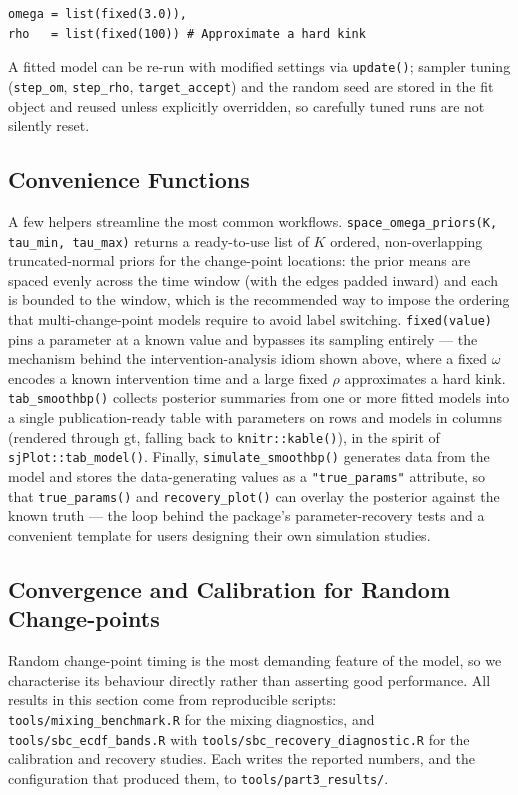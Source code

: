 \documentclass[12pt]{article}
\newcommand{\pkg}[1]{\textsf{#1}}
\newcommand{\code}[1]{\texttt{#1}}
\begin{document}
\begin{verbatim}
omega = list(fixed(3.0)),
rho   = list(fixed(100)) # Approximate a hard kink
\end{verbatim}

A fitted model can be re-run with modified settings via \code{update()}; sampler tuning (\code{step\_om}, \code{step\_rho}, \code{target\_accept}) and the random seed are stored in the fit object and reused unless explicitly overridden, so carefully tuned runs are not silently reset.

\subsection{Convenience Functions}

A few helpers streamline the most common workflows. \code{space\_omega\_priors(K, tau\_min, tau\_max)} returns a ready-to-use list of $K$ ordered, non-overlapping truncated-normal priors for the change-point locations: the prior means are spaced evenly across the time window (with the edges padded inward) and each is bounded to the window, which is the recommended way to impose the ordering that multi-change-point models require to avoid label switching. \code{fixed(value)} pins a parameter at a known value and bypasses its sampling entirely --- the mechanism behind the intervention-analysis idiom shown above, where a fixed $\omega$ encodes a known intervention time and a large fixed $\rho$ approximates a hard kink. \code{tab\_smoothbp()} collects posterior summaries from one or more fitted models into a single publication-ready table with parameters on rows and models in columns (rendered through \pkg{gt}, falling back to \code{knitr::kable()}), in the spirit of \code{sjPlot::tab\_model()}. Finally, \code{simulate\_smoothbp()} generates data from the model and stores the data-generating values as a \code{"true\_params"} attribute, so that \code{true\_params()} and \code{recovery\_plot()} can overlay the posterior against the known truth --- the loop behind the package's parameter-recovery tests and a convenient template for users designing their own simulation studies.

\subsection{Convergence and Calibration for Random Change-points}
\label{sec:calibration}

Random change-point timing is the most demanding feature of the model, so we characterise its behaviour directly rather than asserting good performance. All results in this section come from reproducible scripts: \code{tools/mixing\_benchmark.R} for the mixing diagnostics, and \code{tools/sbc\_ecdf\_bands.R} with \code{tools/sbc\_recovery\_diagnostic.R} for the calibration and recovery studies. Each writes the reported numbers, and the configuration that produced them, to \code{tools/part3\_results/}.
\end{document}
